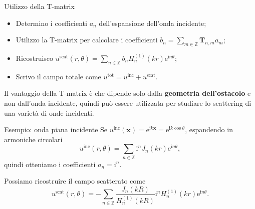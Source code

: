 \documentclass{beamer}
\newcommand{\IZ}{{\mathbb Z}}
\newcommand{\bx}{{\mathbf x}}
\newcommand{\inc}{{\mathrm{inc}}}
\newcommand{\tot}{{\mathrm{tot}}}
\newcommand{\scat}{{\mathrm{scat}}}
\newcommand{\ri}{{\mathrm i}}
\newcommand{\re}{{\mathrm e}}
\begin{document}
	\begin{frame}{Utilizzo della T-matrix}
		\begin{block}{}
			\begin{itemize}
			\item Determino i coefficienti $a_n$ dell'espansione dell'onda incidente;
			\item Utilizzo la T-matrix per calcolare i coefficienti $b_n = \sum_{m \in \IZ} \mathbf{T}_{n,m} a_m$;
			\item Ricostruisco $u^\scat(r,\theta) = \sum_{n \in \IZ} b_n H_n^{(1)}(kr)\re^{\ri n\theta}$;
			\item Scrivo il campo totale come $u^\tot = u^\inc + u^\scat$.
		\end{itemize}
		\end{block}
		Il vantaggio della T-matrix è che dipende solo dalla \textbf{geometria dell'ostacolo} e non dall'onda incidente, quindi può essere utilizzata per studiare lo scattering di una varietà di onde incidenti.
	\end{frame}
	
	\begin{frame}{Esempio: onda piana incidente}
		Se $u^\inc(\bx) = \re^{\ri k \bx} = \re^{\ri k \cos \theta}$, espandendo in armoniche circolari $$u^\inc(r,\theta)=\sum_{n \in \IZ} \ri^n J_n(kr)\re^{\ri n\theta},$$ quindi otteniamo i coefficienti $a_n=\ri^n$.
		\begin{block}{}
			Possiamo ricostruire il campo scatterato come
			\begin{equation*}
				u^\scat(r,\theta) = - \sum_{n \in \IZ} \frac{J_n(kR)}{H_n^{(1)}(kR)} \ri^n H_n^{(1)}(kr) \re^{\ri n \theta}.
			\end{equation*}
		\end{block}
	\end{frame}
	
\end{document}
